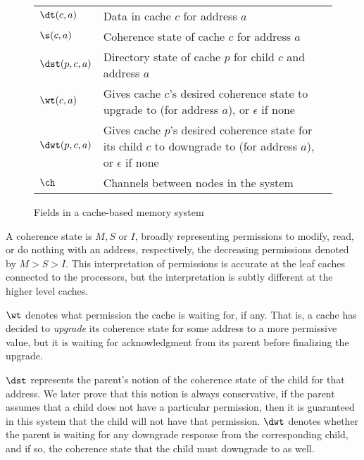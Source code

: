\begin{figure}
\centering
\begin{tabular}{|l|p{6cm}|}
\hline
$\dt(c,a)$ & Data in cache $c$ for address $a$\\
$\s(c,a)$ & Coherence state of cache $c$ for address $a$\\
$\dst(p,c,a)$ & Directory state of cache $p$ for child $c$ and address $a$\\
$\wt(c,a)$ & Gives cache $c$'s desired coherence state to upgrade to (for address $a$), or $\epsilon$ if none\\
$\dwt(p,c,a)$ & Gives cache $p$'s desired coherence state for its child $c$ to downgrade to (for address $a$), or $\epsilon$ if none\\
$\ch$ & Channels between nodes in the system\\
\hline
\end{tabular}
\caption{Fields in a cache-based memory system}
\label{fields}
\end{figure}

A coherence state is $M, S$ or $I$, broadly representing permissions to modify,
read, or do nothing with an address, respectively, the decreasing permissions
denoted by $M > S > I$. This interpretation of permissions is accurate at the
leaf caches connected to the processors, but the
interpretation is subtly different at the higher level caches.

$\wt$ denotes what permission the cache is waiting for,
if any.  That is, a cache has decided to \emph{upgrade} its
coherence state for some address to a more permissive value, but
it is waiting for acknowledgment from its parent before
finalizing the upgrade.

$\dst$ represents the parent's notion of the
coherence state of the child for that address. We later prove that this notion
is always conservative, \ie{} if the parent assumes that a child does not have
a particular permission, then it is guaranteed in this system that the child
will not have that permission.  $\dwt$
denotes whether the parent is waiting for any downgrade response from the
corresponding child, and if so, the coherence state that the child must
downgrade to as well.

